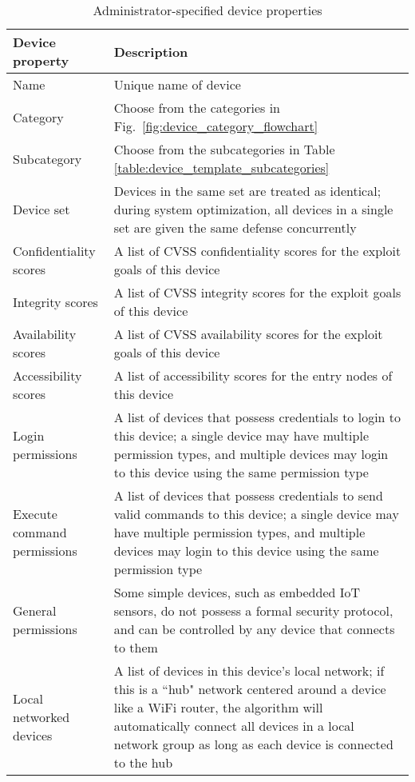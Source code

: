 \documentclass[10pt,journal,compsoc]{IEEEtran}
\begin{document}
\begin {table}[h]
\caption {Administrator-specified device properties}
\begin{tabular}{|m{2cm}|m{6cm}|}
\hline
\textbf{Device property} & \textbf{Description} \\ \hline
Name & Unique name of device \\ \hline
Category & Choose from the categories in Fig.~\ref{fig:device_category_flowchart}	\\ \hline
Subcategory & Choose from the subcategories in Table \ref{table:device_template_subcategories} \\ \hline
Device set & Devices in the same set are treated as identical; during system optimization, all devices in a single set are given the same defense concurrently\\ \hline
Confidentiality scores & A list of CVSS confidentiality scores for the exploit goals of this device\\ \hline
Integrity scores & A list of CVSS integrity scores for the exploit goals of this device\\ \hline
Availability scores & A list of CVSS availability scores for the exploit goals of this device\\ \hline
Accessibility scores & A list of accessibility scores for the entry nodes of this device\\ \hline
Login permissions & A list of devices that possess credentials to login to this
device; a single device may have multiple permission types, and multiple devices may login to this device using the same permission type\\ \hline 
Execute command permissions & A list of devices that possess credentials to send
valid commands to this device; a single device may have multiple permission types, and multiple devices may login to this device using the same permission type\\ \hline
General permissions & Some simple devices, such as embedded IoT sensors, do not possess a formal security protocol, and can be controlled by any device that connects to them \\ \hline
Local networked devices & A list of devices in this device's local network; if this is a
``hub"  network centered around a device like a WiFi router, the algorithm will automatically connect 
all devices in a local network group as long as each device is connected to the hub \\ \hline
\end{tabular}
\label{fig:userspecified_device_properties}		
\end {table}
\end{document}
